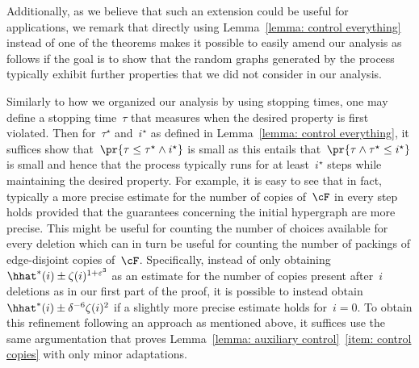 \documentclass[11pt]{amsart}
\newcommand{\eps}{\varepsilon}
\theoremstyle{definition}
\numberwithin{equation}{section}
\begin{document}
	Additionally, as we believe that such an extension could be useful for applications, we remark that directly using Lemma~\ref{lemma: control everything} instead of one of the theorems makes it possible to easily amend our analysis as follows if the goal is to show that the random graphs generated by the process typically exhibit further properties that we did not consider in our analysis.
	
	Similarly to how we organized our analysis by using stopping times, one may define a stopping time~$\tau$ that measures when the desired property is first violated.
	Then for~$\tau^\star$ and~$i^\star$ as defined in Lemma~\ref{lemma: control everything}, it suffices show that~$\pr{\tau\leq \tau^\star\wedge i^\star}$ is small as this entails that~$\pr{\tau\wedge\tau^\star\leq i^\star}$ is small and hence that the process typically runs for at least~$i^\star$ steps while maintaining the desired property.
	For example, it is easy to see that in fact, typically a more precise estimate for the number of copies of~$\cF$ in every step holds provided that the guarantees concerning the initial hypergraph are more precise.
	This might be useful for counting the number of choices available for every deletion which can in turn be useful for counting the number of packings of edge-disjoint copies of~$\cF$.
	Specifically, instead of only obtaining~$\hhat^*(i)\pm \zeta(i)^{1+\eps^3}$ as an estimate for the number of copies present after~$i$ deletions as in our first part of the proof, it is possible to instead obtain~$\hhat^*(i)\pm \delta^{-6}\zeta(i)^2$ if a slightly more precise estimate holds for~$i=0$.
	To obtain this refinement following an approach as mentioned above, it suffices use the same argumentation that proves Lemma~\ref{lemma: auxiliary control}~\ref{item: control copies} with only minor adaptations.
	
\end{document}

